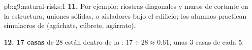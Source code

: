 \begin{solution}{pb:g9:natural-risks:1}
\textbf{11.} Por ejemplo: riostras diagonales y muros de cortante en la
estructura, uniones sólidas, o aisladores bajo el edificio; los alumnos
practican simulacros de  (agáchate, cúbrete, agárrate).

\textbf{12.} \textbf{17 casas} de 28 están dentro de la :
$17 \div 28 \approx 0.61$, unas 3 casas de cada 5.
\end{solution}
